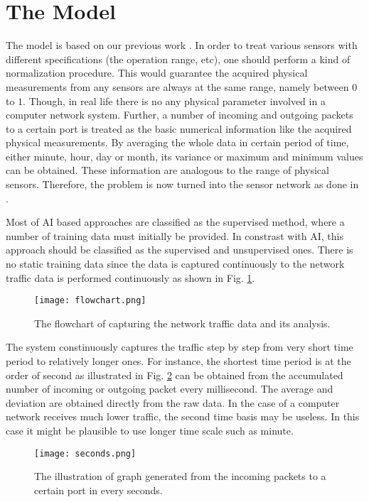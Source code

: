\documentclass[conference,10pt,a4paper]{IEEEtran}
\begin{document}
\section{The Model}
\label{sec:model}

The model is based on our previous work \cite{arya}. In order to treat various sensors with different specifications (the operation range, etc), one should perform a kind of normalization procedure. This would guarantee the acquired physical measurements from any sensors are always at the same range, namely between $0$ to $1$. Though, in real life there is no any physical parameter involved in a computer network system. Further,  a number of incoming and outgoing packets to a certain port is treated as the basic numerical information like the acquired physical measurements. By averaging the whole data in certain period of time, either minute, hour, day or month, its variance or maximum and minimum values can be obtained. These information are analogous to the range of physical sensors. Therefore, the problem is now turned into the sensor network as done in 
 \cite{arya}.
 
Most of AI based approaches are classified as the supervised method, where a number of training data must initially be provided. In constrast with AI, this approach should be classified as the supervised and unsupervised ones. There is no static training data since the data is captured continuously to the network traffic data is performed continuously as shown in Fig. \ref{fig:flowchart}.

\begin{figure}[t!]
 \centering
 \texttt{[image: flowchart.png]}
\caption{The flowchart of capturing the network traffic data and its analysis.}
\label{fig:flowchart}
\end{figure}

The system constinuously captures the traffic step by step from very short time period to relatively longer ones. 
For instance,  the shortest time period is at the order of second as illustrated in Fig. \ref{fig:seconds} can be obtained from the accumulated number of incoming or outgoing packet every millisecond. The average and deviation are obtained directly from the raw data. In the case of a computer network receives much lower traffic, the second time basis may be useless. In this case it might be plausible to use longer time scale such as minute.

\begin{figure}[b!]
 \centering
 \texttt{[image: seconds.png]}
\caption{The illustration of graph generated from the incoming packets to a certain port in every seconds.}
\label{fig:seconds}
\end{figure}
\end{document}
